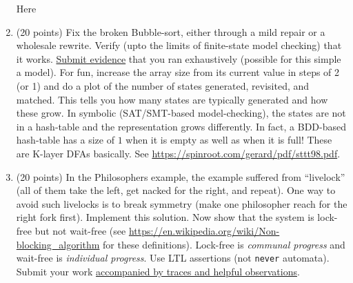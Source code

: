 \documentclass[11pt]{article}
\begin{document}
\begin{enumerate}
\begin{minipage}{\minpagw}
{{      Here
    }%
  }%
\end{minipage}

\clearpage


\item (20 points) Fix the broken Bubble-sort, either through
  a mild repair or a wholesale rewrite.
  Verify (upto the limits of finite-state model checking) that
  it works.
  \underline{Submit evidence} that you ran exhaustively (possible for this simple a model).
    For fun, increase the array size from its current value in steps of 2 (or 1) and do a plot
    of the number of states generated, revisited, and matched. This tells you how many
    states are typically generated and how these grow. In symbolic (SAT/SMT-based model-checking),
    the states are not in a hash-table and the representation grows differently. In fact, a
    BDD-based hash-table has a size of $1$ when it is empty as well as when it is full!
    These are K-layer DFAs basically. See \url{https://spinroot.com/gerard/pdf/sttt98.pdf}.
  
\begin{minipage}{\minpagw}
\end{minipage}

\clearpage

\item (20 points) In the Philosophers example, the example suffered
  from
  ``livelock'' (all of them take the left, get nacked for the right,
  and repeat).
  One way to avoid such livelocks is to break symmetry (make one philosopher
  reach for the right fork first).
  Implement this solution.
  Now show that the system is lock-free but not wait-free
  (see \url{https://en.wikipedia.org/wiki/Non-blocking_algorithm}
  for these definitions).
  Lock-free is {\em communal progress}
  and
  wait-free is {\em individual progress}.
  Use LTL assertions (not {\tt never} automata).
  Submit your work
  \underline{accompanied by traces and helpful observations}.
  
  
\begin{minipage}{\minpagw}
\end{minipage}
\end{enumerate}
\end{document}
